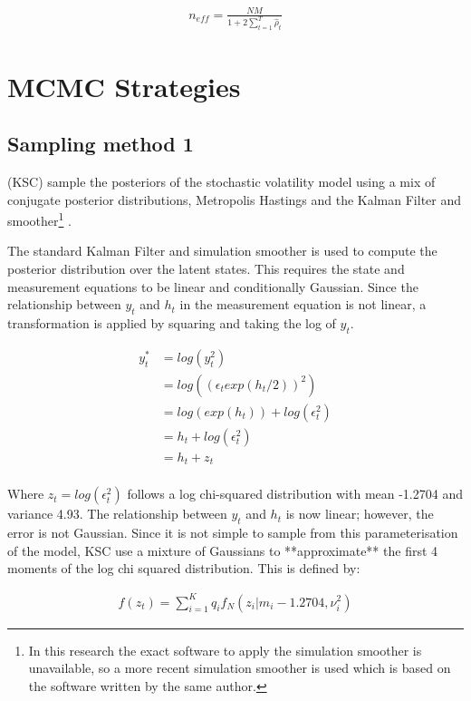 \documentclass[12pt, a4paper]{article}
\begin{document}
            $$
            \begin{aligned}
                n_{eff} = \frac{NM}{1+2 \sum_{t=1}^T \hat{\rho}_t}
            \end{aligned}
            $$

\section{MCMC Strategies}

    \subsection{Sampling method 1}
        (KSC) sample the posteriors of the stochastic volatility model using a mix of conjugate posterior distributions, Metropolis Hastings and the Kalman Filter and smoother\footnote{In this research the exact software to apply the simulation smoother is unavailable, so a more recent simulation smoother is used which is based on the software written by the same author.} \citep{dejong1995}.

        The standard Kalman Filter and simulation smoother is used to compute the posterior distribution over the latent states. This requires the state and measurement equations to be linear and conditionally Gaussian. Since the relationship between $y_t$ and $h_t$ in the measurement equation is not linear, a transformation is applied by squaring and taking the log of $y_t$.

        $$
        \begin{aligned}
        y_t^{*} &= log(y_t^2) \\ 
        &= log((\epsilon_t exp(h_t/2))^2) \\
        &=  log(exp(h_t)) + log(\epsilon_t^2) \\
        &= h_t + log(\epsilon_t^2)  \\
        &= h_t + z_t \\
        \end{aligned}
        $$

        Where $z_t = log(\epsilon_t^2)$ follows a log chi-squared distribution with mean -1.2704 and variance 4.93. The relationship between $y_t$ and $h_t$ is now linear; however, the error is not Gaussian. Since it is not simple to sample from this parameterisation of the model, KSC use a mixture of Gaussians to **approximate** the first 4 moments of the log chi squared distribution. This is defined by:

        $$
        \begin{aligned}
        f(z_t) = \sum_{i=1}^{K} q_if_N(z_i|m_i-1.2704, \nu_i^2)
        \end{aligned}
        $$
\end{document}
